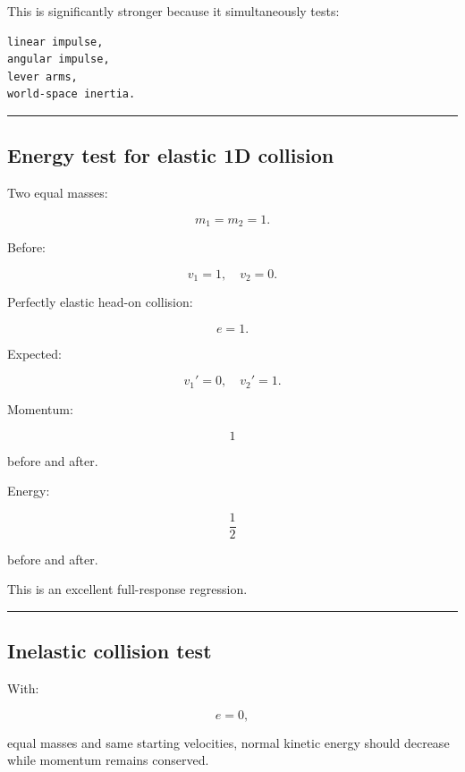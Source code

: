 This is significantly stronger because it simultaneously tests:

\begin{verbatim}
linear impulse,
angular impulse,
lever arms,
world-space inertia.
\end{verbatim}

\begin{center}\rule{0.5\linewidth}{0.5pt}\end{center}

\subsection{Energy test for elastic 1D collision}\label{06-engine-ii-ch039-energy-test-for-elastic-1d-collision}

\hypertarget{06-engine-ii-ch039-energy-test-for-elastic-1d-collision}{}

Two equal masses:

\[
m_1=m_2=1.
\]

Before:

\[
v_1=1,\quad v_2=0.
\]

Perfectly elastic head-on collision:

\[
e=1.
\]

Expected:

\[
v_1'=0,
\quad
v_2'=1.
\]

Momentum:

\[
1
\]

before and after.

Energy:

\[
\frac12
\]

before and after.

This is an excellent full-response regression.

\begin{center}\rule{0.5\linewidth}{0.5pt}\end{center}

\subsection{Inelastic collision test}\label{06-engine-ii-ch039-inelastic-collision-test}

\hypertarget{06-engine-ii-ch039-inelastic-collision-test}{}

With:

\[
e=0,
\]

equal masses and same starting velocities, normal kinetic energy should decrease while momentum remains conserved.

